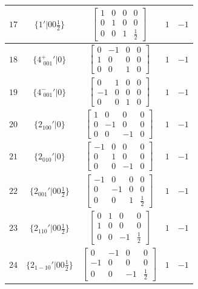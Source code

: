 \documentclass[fleqn,8pt]{jsarticle}
\begin{document}
\begin{longtable}{ccccc}
$ 17 $ & $ \{1{}'|0 0 \frac{1}{2}\} $ & $ \begin{bmatrix} 1 & 0 & 0 & 0 \\ 0 & 1 & 0 & 0 \\ 0 & 0 & 1 & \frac{1}{2} \end{bmatrix} $ & $ 1 $ & $ -1 $ \\ \hline
$ 18 $ & $ \{4^{+}_{\,\,001}{}'|0\} $ & $ \begin{bmatrix} 0 & -1 & 0 & 0 \\ 1 & 0 & 0 & 0 \\ 0 & 0 & 1 & 0 \end{bmatrix} $ & $ 1 $ & $ -1 $ \\ \hline
$ 19 $ & $ \{4^{-}_{\,\,001}{}'|0\} $ & $ \begin{bmatrix} 0 & 1 & 0 & 0 \\ -1 & 0 & 0 & 0 \\ 0 & 0 & 1 & 0 \end{bmatrix} $ & $ 1 $ & $ -1 $ \\ \hline
$ 20 $ & $ \{2{}_{100}{}'|0\} $ & $ \begin{bmatrix} 1 & 0 & 0 & 0 \\ 0 & -1 & 0 & 0 \\ 0 & 0 & -1 & 0 \end{bmatrix} $ & $ 1 $ & $ -1 $ \\ \hline
$ 21 $ & $ \{2{}_{010}{}'|0\} $ & $ \begin{bmatrix} -1 & 0 & 0 & 0 \\ 0 & 1 & 0 & 0 \\ 0 & 0 & -1 & 0 \end{bmatrix} $ & $ 1 $ & $ -1 $ \\ \hline
$ 22 $ & $ \{2{}_{001}{}'|0 0 \frac{1}{2}\} $ & $ \begin{bmatrix} -1 & 0 & 0 & 0 \\ 0 & -1 & 0 & 0 \\ 0 & 0 & 1 & \frac{1}{2} \end{bmatrix} $ & $ 1 $ & $ -1 $ \\ \hline
$ 23 $ & $ \{2{}_{110}{}'|0 0 \frac{1}{2}\} $ & $ \begin{bmatrix} 0 & 1 & 0 & 0 \\ 1 & 0 & 0 & 0 \\ 0 & 0 & -1 & \frac{1}{2} \end{bmatrix} $ & $ 1 $ & $ -1 $ \\ \hline
$ 24 $ & $ \{2{}_{1-10}{}'|0 0 \frac{1}{2}\} $ & $ \begin{bmatrix} 0 & -1 & 0 & 0 \\ -1 & 0 & 0 & 0 \\ 0 & 0 & -1 & \frac{1}{2} \end{bmatrix} $ & $ 1 $ & $ -1 $ \\ \hline

\end{longtable}
\end{document}
